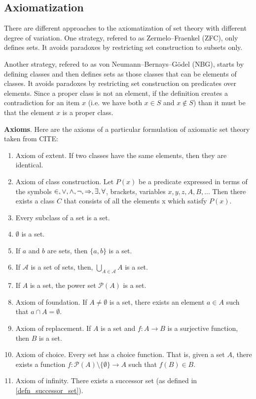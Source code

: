\documentclass{article}
\begin{document}
\subsection{Axiomatization}

There are different approaches to the axiomatization of set theory with different degree of variation. One strategy, refered to as Zermelo–Fraenkel (ZFC), only defines sets. It avoids paradoxes by restricting set construction to subsets only.

Another strategy, refered to as von Neumann–Bernays–Gödel (NBG), starts by defining classes and then defines sets as those classes that can be elements of classes. It avoids paradoxes by restricting set construction on predicates over elements. Since a proper class is not an element, if the definition creates a contradiction for an item $x$ (i.e. we have both $x \in S$ and $x \notin S$) than it must be that the element $x$ is a proper class.

\textbf{Axioms}. Here are the axioms of a particular formulation of axiomatic set theory taken from CITE:
\begin{enumerate}
	\item Axiom of extent. If two classes have the same elements, then they are identical.
	\item Axiom of class construction. Let $P(x)$ be a predicate expressed in terms of the symbols $\in, \vee, \wedge, \neg, \Rightarrow, \exists, \forall$, brackets, variables $x, y, z, A, B, ...$ Then there exists a class $C$ that consists of all the elements x which satisfy $P(x)$.
	\item Every subclass of a set is a set.
	\item $\emptyset$ is a set.
	\item If $a$ and $b$ are sets, then $\{a, b\}$ is a set.
	\item If $\mathcal{A}$ is a set of sets, then, $\bigcup\limits_{A \in \mathcal{A}} A$ is a set.
	\item If $A$ is a set, the power set $\mathcal{P}(A)$ is a set.
	\item Axiom of foundation. If $A \neq \emptyset$ is a set, there exists an element $a \in A$ such that $a \cap A = \emptyset$.
	\item Axiom of replacement. If $A$ is a set and $f : A \to B$ is a surjective function, then $B$ is a set.
	\item Axiom of choice. Every set has a choice function. That is, given a set $A$, there exists a function $f : \mathcal{P}(A) \setminus \{ \emptyset \} \to A$ such that $f(B) \in B$.
	\item Axiom of infinity. There exists a successor set (as defined in \ref{defn_successor_set}).
\end{enumerate}
\end{document}
